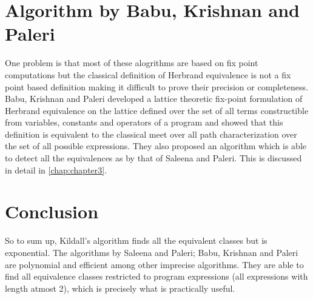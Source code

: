 \section{Algorithm by Babu, Krishnan and Paleri}
\label{sec:AlgorithmByBabuKrishnanAndPaleri}
One problem is that most of these alogrithms are based on fix point 
computations but the classical definition of Herbrand equivalence is 
not a fix point based definition making it difficult to prove their 
precision or completeness. Babu, Krishnan and Paleri \cite{Babu} 
developed a lattice theoretic fix-point formulation of Herbrand 
equivalence on the lattice defined over the set of all terms constructible 
from variables, constants and operators of a program and showed that 
this definition is equivalent to the classical meet over all path 
characterization over the set of all possible expressions. They also 
proposed an algorithm which is able to detect all the equivalences as 
by that of Saleena and Paleri. This is discussed in detail in 
\autoref{chap:chapter3}.

\section{Conclusion}
\label{sec:Conclusion}
So to sum up, Kildall’s algorithm finds all the equivalent classes but 
is exponential. The algorithms by Saleena and Paleri; Babu, Krishnan 
and Paleri are polynomial and efficient among other imprecise algorithms. 
They are able to find all equivalence classes restricted to program 
expressions (all expressions with length atmost 2), which is precisely 
what is practically useful.
